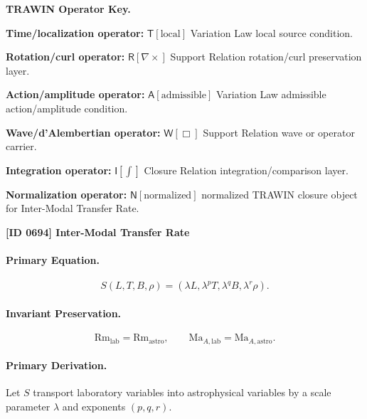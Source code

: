 \par\vspace{0.45\baselineskip}
\noindent\begin{minipage}[t]{\linewidth}
\begingroup
\small
\raggedright
\textbf{TRAWIN Operator Key.}\par
\noindent\textbf{Time/localization operator:} $\mathsf{T}\!\left[\mathrm{local}\right]$ Variation Law local source condition.\par
\noindent\textbf{Rotation/curl operator:} $\mathsf{R}\!\left[\nabla\times\right]$ Support Relation rotation/curl preservation layer.\par
\noindent\textbf{Action/amplitude operator:} $\mathsf{A}\!\left[\mathrm{admissible}\right]$ Variation Law admissible action/amplitude condition.\par
\noindent\textbf{Wave/d'Alembertian operator:} $\mathsf{W}\!\left[\Box\right]$ Support Relation wave or operator carrier.\par
\noindent\textbf{Integration operator:} $\mathsf{I}\!\left[\int\right]$ Closure Relation integration/comparison layer.\par
\noindent\textbf{Normalization operator:} $\mathsf{N}\!\left[\mathrm{normalized}\right]$ normalized TRAWIN closure object for Inter-Modal Transfer Rate.\par
\endgroup
\end{minipage}

\clearpage
\noindent\textbf{[ID 0694] Inter-Modal Transfer Rate}\par
\vspace{0.35em}
\paragraph{Primary Equation.}
\begin{equation}
S(L,T,B,\rho)
=
(\lambda L,\lambda^{p}T,\lambda^{q}B,\lambda^{r}\rho).
\end{equation}

\paragraph{Invariant Preservation.}
\begin{equation}
\mathrm{Rm}_{\mathrm{lab}}=\mathrm{Rm}_{\mathrm{astro}},
\qquad
\mathrm{Ma}_{A,\mathrm{lab}}=\mathrm{Ma}_{A,\mathrm{astro}}.
\end{equation}

\paragraph{Primary Derivation.}
Let $S$ transport laboratory variables into astrophysical variables by a scale parameter $\lambda$ and exponents $(p,q,r)$.


